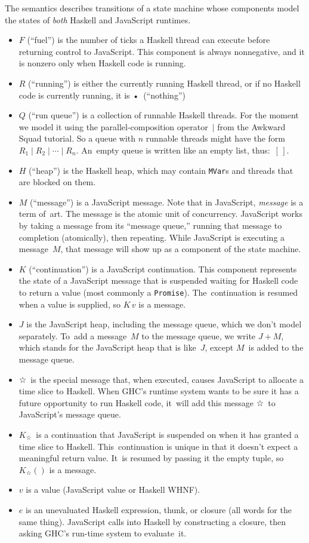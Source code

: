 \documentclass{article}
\newcommand\slicemessage{\mbox{☆}}
\newcommand\slicecont{\ensuremath{K_{☆}}}
\newcommand\notrunning{\mbox{•}}
\newcommand\emptylist{\ensuremath{[\,]}}
\begin{document}
The semantics describes transitions of a state machine whose
components model the states of \emph{both} Haskell and JavaScript runtimes.
\begin{itemize}
\item
  $F$ (``fuel'') is the number of ticks a Haskell thread can
  execute before returning control to JavaScript. This component is
  always nonnegative, and it is
  nonzero only when Haskell code is running.
\item
  $R$ (``running'') is either the currently running Haskell
  thread, or if no Haskell code is currently running, it is \notrunning\ (``nothing'')
\item
  $Q$ (``run queue'') is a collection of runnable Haskell threads.
  For the moment we model it using the parallel-composition
  operator~$\mid$ from the Awkward Squad tutorial.
  So a queue with $n$ runnable threads might have the form $R_1 \mid
  R_2 \mid \cdots \mid R_n$.
  An~empty queue is written like an empty list, thus:~\emptylist.
\item
  $H$ (``heap'') is the Haskell heap, which may contain
  \texttt{MVar}s and threads that are blocked on them.
\item
$M$ (``message'') is a JavaScript message.
Note that in JavaScript,  \emph{message} is a term of~art.
The message is the atomic unit of concurrency.
JavaScript works by taking a message from its ``message queue,''
running that message to completion (atomically),
then repeating.
While JavaScript is executing a message~$M$, that message will show up
as a component of the state machine.
\item
$K$ (``continuation'') is a JavaScript continuation.
This component represents the state of a JavaScript message that is
suspended waiting for Haskell code to return a value (most commonly a
\texttt{Promise}). 
The~continuation is resumed when a value is supplied, so
$K\,v$ is a message.
\item
$J$ is the JavaScript heap, including the message queue, which we
don't model separately.
To~add a message~$M$ to the message queue, we write
$J+M$, which stands for the JavaScript heap that is like~$J$, except
$M$~is added to the message queue.
\item
\slicemessage\ is the special message that, when executed, causes JavaScript
to allocate a time slice to Haskell.
When GHC's runtime system wants to be sure it has a future opportunity
to run Haskell code, it~will add this message \slicemessage\ to
JavaScript's message queue.
\item
\slicecont\ is a continuation that JavaScript is suspended on when
it has granted a time slice to Haskell.
This~continuation is unique in that it doesn't expect a meaningful
return value. 
It~is resumed by passing it the empty tuple, so $\slicecont()$ is a message.
\item
$v$ is a value (JavaScript value or Haskell WHNF).
\item
$e$ is an unevaluated Haskell expression, thunk, or closure (all words for the same
thing).
JavaScript calls into Haskell by constructing a closure, then asking
GHC's run-time system to evaluate~it.
\end{itemize}
\end{document}
